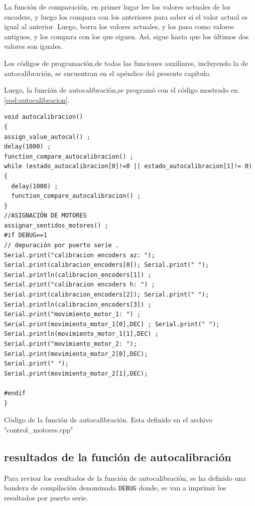 La función de comparación, en primer lugar lee los valores actuales de los encoders, y luego los compara con los anteriores para saber si el valor actual es igual al anterior. Luego, borra los valores actuales, y los pasa como valores antiguos, y los compara con los que siguen. Asì, sigue hasta que los últimos dos valores son iguales.

Los códigos de programación,de todas las funciones auxiliares, incluyendo la de autocalibración, se encuentran en el apéndice del presente capítulo. 

Luego, la función de autocalibración,se programó con el código mostrado en \ref{cod:autocalibracion}. 

\begin{listing}[ht]
	\begin{verbatim}
void autocalibracion()
{
assign_value_autocal() ;
delay(1000) ; 
function_compare_autocalibracion() ; 
while (estado_autocalibracion[0]!=0 || estado_autocalibracion[1]!= 0)
{
  delay(1000) ;     
  function_compare_autocalibracion() ;             
}
//ASIGNACIÓN DE MOTORES 
assignar_sentidos_motores() ; 
#if DEBUG==1
// depuración por puerto serie . 
Serial.print("calibracion encoders az: ");                   
Serial.print(calibracion_encoders[0]); Serial.print(" ");
Serial.println(calibracion_encoders[1]) ;
Serial.print("calibracion encoders h: ") ;
Serial.print(calibracion_encoders[2]); Serial.print(" ");
Serial.println(calibracion_encoders[3]) ;
Serial.print("movimiento_motor_1: ") ; 
Serial.print(movimiento_motor_1[0],DEC) ; Serial.print(" "); 
Serial.println(movimiento_motor_1[1],DEC) ;
Serial.print("movimiento_motor_2: ");
Serial.print(movimiento_motor_2[0],DEC); 
Serial.print(" ");
Serial.print(movimiento_motor_2[1],DEC); 			

#endif    	
}
\end{verbatim}
\caption{Código de la función de autocalibración. Esta definido en el archivo "control\_motores.cpp"}
\label{cod:autocalibracion}

\end{listing}

\subsection{resultados de la función de autocalibración}

Para revisar los resultados de la función de autocalibración, se ha definido una bandera de compilación denominada \texttt{DEBUG} donde, se van a imprimir los resultados por puerto serie. 

